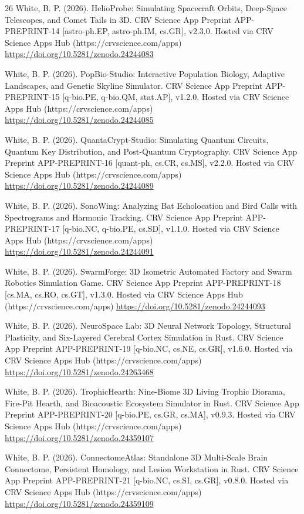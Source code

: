\documentclass[10pt,letterpaper]{article}
\begin{document}
\begin{thebibliography}{26}
 White, B. P. (2026). HelioProbe: Simulating Spacecraft Orbits, Deep-Space Telescopes, and Comet Tails in 3D. CRV Science App Preprint APP-PREPRINT-14 [astro-ph.EP, astro-ph.IM, cs.GR], v2.3.0. Hosted via CRV Science Apps Hub (https://crvscience.com/apps) \url{https://doi.org/10.5281/zenodo.24244083}

 White, B. P. (2026). PopBio-Studio: Interactive Population Biology, Adaptive Landscapes, and Genetic Skyline Simulator. CRV Science App Preprint APP-PREPRINT-15 [q-bio.PE, q-bio.QM, stat.AP], v1.2.0. Hosted via CRV Science Apps Hub (https://crvscience.com/apps) \url{https://doi.org/10.5281/zenodo.24244085}

 White, B. P. (2026). QuantaCrypt-Studio: Simulating Quantum Circuits, Quantum Key Distribution, and Post-Quantum Cryptography. CRV Science App Preprint APP-PREPRINT-16 [quant-ph, cs.CR, cs.MS], v2.2.0. Hosted via CRV Science Apps Hub (https://crvscience.com/apps) \url{https://doi.org/10.5281/zenodo.24244089}

 White, B. P. (2026). SonoWing: Analyzing Bat Echolocation and Bird Calls with Spectrograms and Harmonic Tracking. CRV Science App Preprint APP-PREPRINT-17 [q-bio.NC, q-bio.PE, cs.SD], v1.1.0. Hosted via CRV Science Apps Hub (https://crvscience.com/apps) \url{https://doi.org/10.5281/zenodo.24244091}

 White, B. P. (2026). SwarmForge: 3D Isometric Automated Factory and Swarm Robotics Simulation Game. CRV Science App Preprint APP-PREPRINT-18 [cs.MA, cs.RO, cs.GT], v1.3.0. Hosted via CRV Science Apps Hub (https://crvscience.com/apps) \url{https://doi.org/10.5281/zenodo.24244093}

 White, B. P. (2026). NeuroSpace Lab: 3D Neural Network Topology, Structural Plasticity, and Six-Layered Cerebral Cortex Simulation in Rust. CRV Science App Preprint APP-PREPRINT-19 [q-bio.NC, cs.NE, cs.GR], v1.6.0. Hosted via CRV Science Apps Hub (https://crvscience.com/apps) \url{https://doi.org/10.5281/zenodo.24263468}

 White, B. P. (2026). TrophicHearth: Nine-Biome 3D Living Trophic Diorama, Fire-Pit Hearth, and Bioacoustic Ecosystem Simulator in Rust. CRV Science App Preprint APP-PREPRINT-20 [q-bio.PE, cs.GR, cs.MA], v0.9.3. Hosted via CRV Science Apps Hub (https://crvscience.com/apps) \url{https://doi.org/10.5281/zenodo.24359107}

 White, B. P. (2026). ConnectomeAtlas: Standalone 3D Multi-Scale Brain Connectome, Persistent Homology, and Lesion Workstation in Rust. CRV Science App Preprint APP-PREPRINT-21 [q-bio.NC, cs.SI, cs.GR], v0.8.0. Hosted via CRV Science Apps Hub (https://crvscience.com/apps) \url{https://doi.org/10.5281/zenodo.24359109}


\end{thebibliography}
\end{document}
